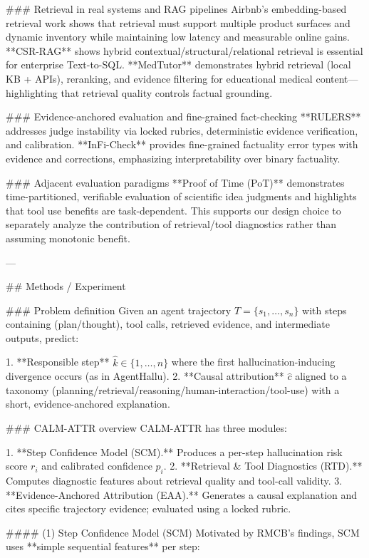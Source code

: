 ### Retrieval in real systems and RAG pipelines  
Airbnb’s embedding-based retrieval work shows that retrieval must support multiple product surfaces and dynamic inventory while maintaining low latency and measurable online gains. **CSR-RAG** shows hybrid contextual/structural/relational retrieval is essential for enterprise Text-to-SQL. **MedTutor** demonstrates hybrid retrieval (local KB + APIs), reranking, and evidence filtering for educational medical content—highlighting that retrieval quality controls factual grounding.

### Evidence-anchored evaluation and fine-grained fact-checking  
**RULERS** addresses judge instability via locked rubrics, deterministic evidence verification, and calibration. **InFi-Check** provides fine-grained factuality error types with evidence and corrections, emphasizing interpretability over binary factuality.

### Adjacent evaluation paradigms  
**Proof of Time (PoT)** demonstrates time-partitioned, verifiable evaluation of scientific idea judgments and highlights that tool use benefits are task-dependent. This supports our design choice to separately analyze the contribution of retrieval/tool diagnostics rather than assuming monotonic benefit.

---

## Methods / Experiment  

### Problem definition  
Given an agent trajectory \(T = \{s_1,\dots,s_n\}\) with steps containing (plan/thought), tool calls, retrieved evidence, and intermediate outputs, predict:

1. **Responsible step** \( \hat{k} \in \{1,\dots,n\} \) where the first hallucination-inducing divergence occurs (as in AgentHallu).  
2. **Causal attribution** \( \hat{c} \) aligned to a taxonomy (planning/retrieval/reasoning/human-interaction/tool-use) with a short, evidence-anchored explanation.

### CALM-ATTR overview  
CALM-ATTR has three modules:

1. **Step Confidence Model (SCM).** Produces a per-step hallucination risk score \(r_i\) and calibrated confidence \(p_i\).  
2. **Retrieval & Tool Diagnostics (RTD).** Computes diagnostic features about retrieval quality and tool-call validity.  
3. **Evidence-Anchored Attribution (EAA).** Generates a causal explanation and cites specific trajectory evidence; evaluated using a locked rubric.

#### (1) Step Confidence Model (SCM)  
Motivated by RMCB’s findings, SCM uses **simple sequential features** per step:


